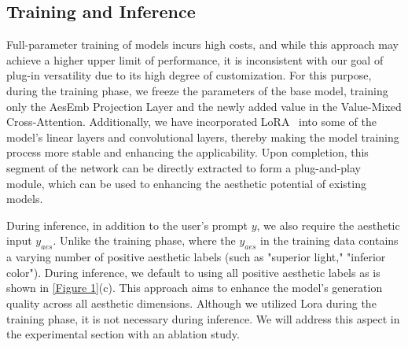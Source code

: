 \subsection{Training and Inference}\label{sec3.4}
Full-parameter training of models incurs high costs, and while this approach may achieve a higher upper limit of performance, it is inconsistent with our goal of plug-in versatility due to its high degree of customization. For this purpose, during the training phase, we freeze the parameters of the base model, training only the AesEmb Projection Layer and the newly added value in the Value-Mixed Cross-Attention. Additionally, we have incorporated LoRA~\cite{hu2021lora} into some of the model's linear layers and convolutional layers, thereby making the model training process more stable and enhancing the applicability. Upon completion, this segment of the network can be directly extracted to form a plug-and-play module, which can be used to enhancing the aesthetic potential of existing models.

During inference, in addition to the user's prompt $y$, we also require the aesthetic input $y_{aes}$. Unlike the training phase, where the $y_{aes}$ in the training data contains a varying number of positive aesthetic labels (such as "superior light," "inferior color"). During inference, we default to using all positive aesthetic labels as is shown in \cref{Figure 1}(c). This approach aims to enhance the model's generation quality across all aesthetic dimensions. Although we utilized Lora during the training phase, it is not necessary during inference. We will address this aspect in the experimental section with an ablation study.